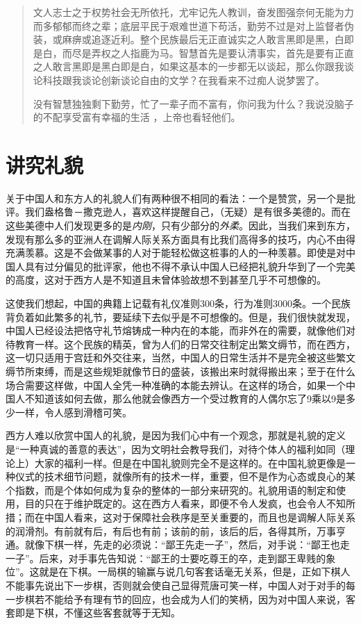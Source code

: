 \documentclass[12pt,oneside]{book}
\begin{document}
\begin{common-format}
\begin{quotation}
文人志士之于权势社会无所依托，尤牢记先人教训，奋发图强奈何无能为力而多郁郁而终之辈；底层平民于艰难世道下苟活，勤劳不过是对上监督者伪装，或麻痹或追逐近利。整个民族最后无正直诚实之人敢言黑即是黑，白即是白，而尽是弄权之人指鹿为马。智慧首先是要认清事实，首先是要有正直之人敢言黑即是黑白即是白，如果这基本的一步都无以谈起，那么你跟我谈论科技跟我谈论创新谈论自由的文学？在我看来不过痴人说梦罢了。

没有智慧独独剩下勤劳，忙了一辈子而不富有，你问我为什么？我说没脑子的不配享受富有幸福的生活 ，上帝也看轻他们。
\end{quotation}


\chapter{讲究礼貌}
关于中国人和东方人的礼貌人们有两种很不相同的看法：一个是赞赏，另一个是批评。我们盎格鲁－撒克逊人，喜欢这样提醒自己，（无疑）是有很多美德的。而在这些美德中人们发现更多的是\textit{内刚}，只有少部分的\textit{外柔}。因此，当我们来到东方，发现有那么多的亚洲人在调解人际关系方面具有比我们高得多的技巧，内心不由得充满羡慕。这是不会做某事的人对于能轻松做这桩事的人的一种羡慕。即使是对中国人具有过分偏见的批评家，他也不得不承认中国人已经把礼貌升华到了一个完美的高度，这对于西方人是不知道且未曾体验故想不到甚至几乎不可想像的。 

这使我们想起，中国的典籍上记载有礼仪准则300条，行为准则3000条。一个民族背负着如此繁多的礼节，要延续下去似乎是不可想像的。但是，我们很快就发现，中国人已经设法把恪守礼节熔铸成一种内在的本能，而非外在的需要，就像他们对待教育一样。这个民族的精英，曾为人们的日常交往制定出繁文缛节，而在西方，这一切只适用于宫廷和外交往来，当然，中国人的日常生活并不是完全被这些繁文缛节所束缚，而是这些规矩就像节日的盛装，该搬出来时就得搬出来；至于在什么场合需要这样做，中国人全凭一种准确的本能去辨认。在这样的场合，如果一个中国人不知道该如何去做，那么他就会像西方一个受过教育的人偶尔忘了9乘以9是多少一样，令人感到滑稽可笑。 

西方人难以欣赏中国人的礼貌，是因为我们心中有一个观念，那就是礼貌的定义是“一种真诚的善意的表达”，因为文明社会教导我们，对待个体人的福利如同（理论上）大家的福利一样。但是在中国礼貌则完全不是这样的。在中国礼貌更像是一种仪式的技术细节问题，就像所有的技术一样，重要，但不是作为心态或良心的某个指数，而是个体如何成为复杂的整体的一部分来研究的。礼貌用语的制定和使用，目的只在于维护既定的。这在西方人看来，即便不令人发疯，也会令人不知所措；而在中国人看来，这对于保障社会秩序是至关重要的，而且也是调解人际关系的润滑剂。有前就有后，有后也有前；该前的前，该后的后，各得其所，万事亨通。就像下棋一样，先走的必须说：“鄙王先走一子”，然后，对手说：“鄙王也走一子”。后来，对手事先告知说：“鄙王的士要吃尊王的卒，走到鄙王卑贱的象位”。这就是在下棋。一局棋的输赢与说几句客套话毫无关系，但是，正如下棋人不能事先说出下一步棋，否则就会使自己显得荒唐可笑一样，中国人对于对手的每一步棋若不能给予有理有节的回应，也会成为人们的笑柄，因为对中国人来说，客套即是下棋，不懂这些客套就等于无知。 


\end{common-format}
\end{document}
